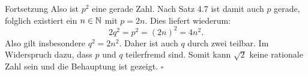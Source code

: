 \begin{frame}
\begin{block}{Fortsetzung}
Also ist $p^2$ eine gerade Zahl.
Nach Satz 4.7 ist damit auch $p$ gerade, folglich existiert ein $n \in \mathbb{N}$
mit $p = 2n$.
Dies liefert wiederum:
\[
  2q^2 = p^2 = (2n)^2 = 4n^2.
\]
Also gilt insbesondere $q^2 = 2n^2$.
Daher ist auch $q$ durch zwei teilbar.
Im Widerspruch dazu, dass $p$ und $q$ teilerfremd sind.
Somit kann $\sqrt{2}$ keine rationale Zahl sein und die Behauptung ist gezeigt.
\hfill $\square$
\end{block}
\end{frame}
